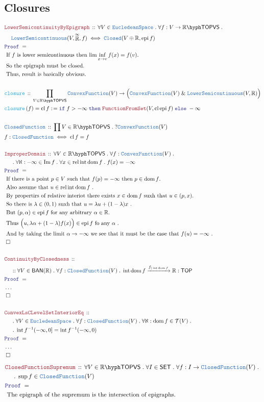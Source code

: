 \documentclass[12pt]{scrartcl}
\newcommand{\TYPE}[1]{\textcolor{NavyBlue}{\mathtt{#1}}}
\newcommand{\FUNC}[1]{\textcolor{Cerulean}{\mathtt{#1}}}
\newcommand{\LOGIC}[1]{\textcolor{Blue}{\mathtt{#1}}}
\newcommand{\THM}[1]{\textcolor{Maroon}{\mathtt{#1}}}
\renewcommand{\.}{\; . \;}
\newcommand{\de}{: \kern 0.1pc =}
\newcommand{\If}{\LOGIC{if} \;}
\newcommand{\Then}{ \; \LOGIC{then} \;}
\newcommand{\Else}{\; \LOGIC{else} \;}
\newcommand{\Act}[1]{\left( #1 \right)}
\newcommand{\Theorem}[2]{& \THM{#1} \, :: \, #2 \\ & \Proof = \\ }
\newcommand{\DeclareType}[2]{& \TYPE{#1} \, :: \, #2 \\}
\newcommand{\DefineType}[3]{& #1 : \TYPE{#2} \iff #3 \\}
\newcommand{\DeclareFunc}[2]{& \FUNC{#1} \, :: \, #2 \\}
\newcommand{\DefineNamedFunc}[4]{&  \FUNC{#1}\Act{#2} = #3 \de #4 \\}
\newcommand{\NewLine}{\\ & \kern 1pc}
\newcommand{\Page}[1]{ \begin{align*} #1 \end{align*}   }
\newcommand{\NoProof}{ & \ldots \\ \EndProof}
\renewcommand{\And}{\; \& \;}
\newcommand{\Reals}{\mathbb{R} }
\newcommand{\EReals}{\stackrel{\mathclap{\infty}}{\mathbb{R}}}
\DeclareMathOperator*{\im}{Im}
\newcommand{\Arrow}{\xrightarrow}
\newcommand{\QED}{\; \square}
\newcommand{\EndProof}{& \QED \\}
\newcommand{\Proof}{\LOGIC{Proof} \; }
\newcommand{\Explain}[1]{& \text{#1.} \\}
\DeclareMathOperator*{\dom}{dom}
\newcommand{\SET}{\mathsf{SET}}
\newcommand{\TOPVS}[1]{#1\hyph\mathsf{TOPVS}} %
\newcommand{\Euc}{\TYPE{EucledeanSpace}}
\newcommand{\rint}{{\mathrm{rel}  \intx}}
\newcommand{\Closed}{\TYPE{Closed}}
\DeclareMathOperator*{\intx}{int}
\DeclareMathOperator*{\cl}{cl}
\newcommand{\TOP}{\mathsf{TOP}}
\newcommand{\T}{\mathcal{T}}
\newcommand{\CF}{\TYPE{ConvexFunction}}
\newcommand{\ClF}{\TYPE{ClosedFunction}}
\DeclareMathOperator{\epi}{epi}
\newcommand{\LsC}{\TYPE{LowerSemicontinuous}}
\begin{document}
\subsection{Closures}
\Page{
	\Theorem{LowerSemicontinuityByEpigraph}
	{
		\forall V \in \Euc \.
		\forall f : V \to \TOPVS{\Reals} \.
		\NewLine 
		\LsC(V,\EReals,f)
		\iff
		\Closed(V\oplus \Reals, \epi f)
	}
	\Explain{
		If $f$ is lower semicontinuous then $\lim \inf_{x \to v} f(x) = f(v)$}
	\Explain{
		So the epigraph must be closed}
	\Explain{
		Thus, result is basically obvious}
	\\
	\DeclareFunc{closure}
	{
		\prod_{V \in \TOPVS{\Reals}} \CF(V) \to \Big(\CF(V) \And \LsC(V,\Reals)\Big)
	}
	\DefineNamedFunc{closure}{f}{\cl f}
	{
		\If  f > -\infty \Then \THM{FunctionFromSet}(V,\cl \epi f) \Else -\infty
	}
	\\
	\DeclareType{ClosedFunction}{\prod V \in \TOPVS{\Reals} \. ?\CF(V) }
	\DefineType{f}{ClosedFunction}{\cl f = f}
	\\
	\Theorem{ImproperDomain}
	{
		\forall V \in \TOPVS{\Reals} \.
		\forall f : \CF(V) \. \NewLine \.
		\forall \aleph : -\infty \in \im f \.
		\forall x \in \rint \dom f \.
		f(x) = -\infty
	}
	\Explain{
		If there is a point $p \in V$ such that $f(p) = -\infty$ then $p \in \dom f$}
	\Explain{
		Also assume that $u \in \rint \dom f$		
	}
	\Explain{
		By propertirs of relative interiot there exists $x \in \dom f$ suxh that $u \in (p,x)$}
	\Explain{
		So there is $\lambda \in (0,1)$ suxh that $u = \lambda u + (1-\lambda)x$
	}
	\Explain{
		But $(p,\alpha) \in \epi f$ for any  arbitrary $\alpha \in \Reals$}
	\Explain{
		Thus $\Big( u, \lambda \alpha + (1-\lambda)f(x) \Big) \in \epi f$ fo any $\alpha$
	}
	\Explain{
		And by taking the limit $\alpha \to -\infty$ we see that it must be the case
		that $f(u) = -\infty$
	}
	\EndProof
	\\
	\Theorem{ContinuityByClosedness}
	{
		\NewLine ::		
		\forall V \in \mathsf{BAN}(\Reals) \.
		\forall f : \ClF(V) \. 
		\intx \dom f \Arrow{f_{|\intx \dom f}} \Reals : \TOP
	}
	\NoProof
	\\
	\Theorem{ConvexLsCLevelSetInteriorEq}
	{
		\NewLine \. 		
		\forall V \in \Euc \.
		\forall f : \ClF(V) \.
		\forall \aleph : \dom f \in \T(V) \. \NewLine \.
		\intx f^{-1}(-\infty,0] = \intx f^{-1}(-\infty,0)
	}
	\NoProof
}\Page{
	\Theorem{ClosedFunctionSupremum}
	{
		\forall V \in \TOPVS{\Reals} \.
		\forall I \in \SET \.
		\forall f : I \to \ClF(V) \. \NewLine \.
		\sup f  \in \ClF(V)  
	}
	\Explain{
		The epigraph of the supremum is the intersection of epigraphs}
}
\end{document}
